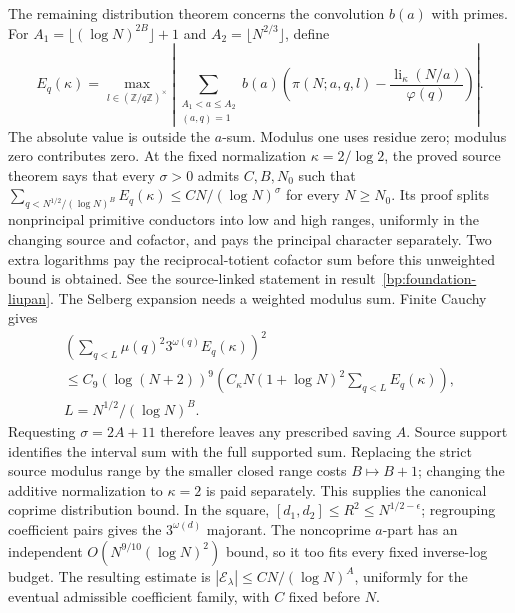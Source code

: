 The remaining distribution theorem concerns the convolution $b(a)$ with
primes.  For $A_1=\lfloor(\log N)^{2B}\rfloor+1$ and
$A_2=\lfloor N^{2/3}\rfloor$, define
\[
 E_q(\kappa)=\max_{l\in(\mathbb Z/q\mathbb Z)^\times}
 \left|\sum_{\substack{A_1<a\le A_2\\(a,q)=1}}b(a)
  \left(\pi(N;a,q,l)-\frac{\operatorname{li}_{\kappa}(N/a)}{\varphi(q)}\right)\right|.
\]
The absolute value is outside the $a$-sum.  Modulus one uses residue zero; modulus zero contributes zero.  At the fixed normalization $\kappa=2/\log2$,
the proved source theorem says that every $\sigma>0$ admits $C,B,N_0$ such that
$\sum_{q<N^{1/2}/(\log N)^B}E_q(\kappa)\le CN/(\log N)^\sigma$
for every $N\ge N_0$.  Its proof splits nonprincipal primitive conductors
into low and high ranges, uniformly in the changing source and cofactor,
and pays the principal character separately.  Two extra logarithms pay the
reciprocal-totient cofactor sum before this unweighted bound is obtained.
See the source-linked statement in result~\ref{bp:foundation-liupan}.
The Selberg expansion needs a weighted modulus sum.  Finite Cauchy gives
\[\begin{gathered}
 \left(\sum_{q<L}\mu(q)^2 3^{\omega(q)}E_q(\kappa)\right)^2\\
 \le C_9(\log(N+2))^9
       \left(C_\kappa N(1+\log N)^2\sum_{q<L}E_q(\kappa)\right),\\
 L=N^{1/2}/(\log N)^B.
\end{gathered}\]
Requesting $\sigma=2A+11$ therefore leaves any prescribed saving $A$.
Source support identifies the interval sum with the full supported sum.
Replacing the strict source modulus range by the smaller closed range costs
$B\mapsto B+1$; changing the additive normalization to $\kappa=2$ is paid
separately.  This supplies the canonical coprime distribution bound.
In the square, $[d_1,d_2]\le R^2\le N^{1/2-\epsilon}$; regrouping coefficient
pairs gives the $3^{\omega(d)}$ majorant.  The noncoprime $a$-part has an
independent $O(N^{9/10}(\log N)^2)$ bound, so it too fits every fixed
inverse-log budget.  The resulting estimate is
$|\mathcal E_\lambda|\le C N/(\log N)^A$, uniformly for the eventual
admissible coefficient family, with $C$ fixed before $N$.

